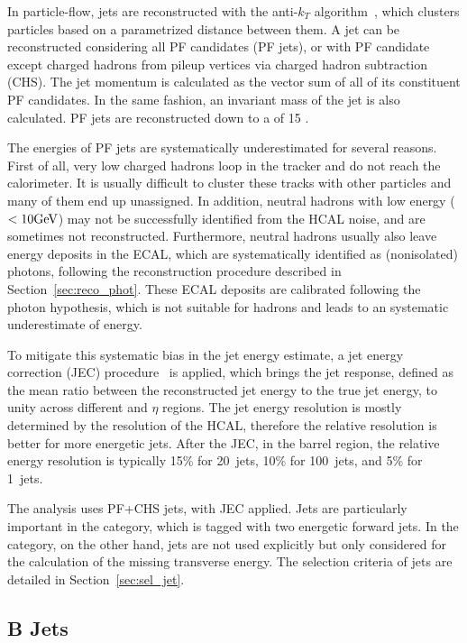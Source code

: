 In particle-flow, jets are reconstructed with the anti-$k_{T}$ algorithm~\cite{Cacciari_2008, fastjet},
which clusters particles based on a parametrized distance between them.
A jet can be reconstructed considering all PF candidates (PF jets), 
or with PF candidate except charged hadrons from pileup vertices via charged hadron subtraction (CHS). 
The jet momentum is calculated as the vector sum of all of its constituent PF candidates.
In the same fashion, an invariant mass of the jet is also calculated. 
PF jets are reconstructed down to a \pt of 15 \GeV.

The energies of PF jets are systematically underestimated for several reasons.
First of all, very low \pt charged hadrons loop in the tracker and do not reach the calorimeter.
It is usually difficult to cluster these tracks with other particles and many of them end up unassigned.
In addition, neutral hadrons with low energy ($< 10 \mbox{GeV}$) may not be successfully identified from the HCAL noise, and are sometimes not reconstructed.
Furthermore, neutral hadrons usually also leave energy deposits in the ECAL, 
which are systematically identified as (nonisolated) photons,
following the reconstruction procedure described in Section~\ref{sec:reco_phot}.
These ECAL deposits are calibrated following the photon hypothesis, 
which is not suitable for hadrons and leads to an systematic underestimate of energy.

To mitigate this systematic bias in the jet energy estimate, 
a jet energy correction (JEC) procedure~\cite{Khachatryan_2017} is applied,
which brings the jet response, defined as the mean ratio between the reconstructed jet energy to the true jet energy,
to unity across different \pt and $\eta$ regions.
The jet energy resolution is mostly determined by the resolution of the HCAL, 
therefore the relative resolution is better for more energetic jets.
After the JEC, in the barrel region, the relative energy resolution is typically 15\% for 20~\GeV jets,
10\% for 100~\GeV jets, and 5\% for 1~\TeV jets. 

The \hmm analysis uses PF+CHS jets, with JEC applied.
Jets are particularly important in the \qqH category, which is tagged with two energetic forward jets.
In the \VH category, on the other hand, jets are not used explicitly but only considered for the calculation of the missing transverse energy. 
The selection criteria of jets are detailed in Section~\ref{sec:sel_jet}.

\subsection{B Jets}\label{sec:reco_btag}

